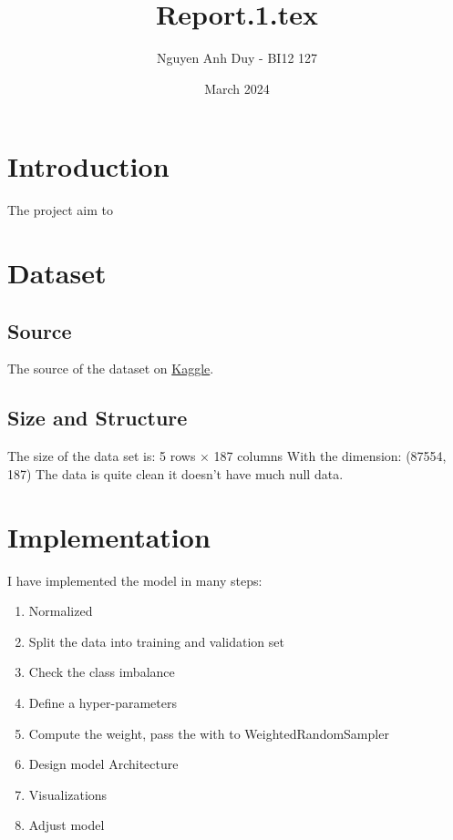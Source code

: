 \documentclass{article}
\title{Report.1.tex}
\author{Nguyen Anh Duy - BI12 127}
\date{March 2024}
\begin{document}
\maketitle

\section{Introduction}
The project aim to 

\section{Dataset}
\subsection{Source}
The source of the dataset on \href{https://www.kaggle.com/datasets/shayanfazeli/heartbeat}{Kaggle}.
\subsection{Size and Structure}
The size of the data set is:
5 rows × 187 columns
With the dimension:
(87554, 187)
The data is quite clean it doesn't have much null data.
\section{Implementation}
I have implemented the model in many steps:
\begin{enumerate}
\item Normalized
\item Split the data into training and validation set
\item Check the class imbalance
\item Define a hyper-parameters
\item Compute the weight, pass the with to WeightedRandomSampler
\item Design model Architecture
\item Visualizations
\item Adjust model
\end{enumerate}
\end{document}
